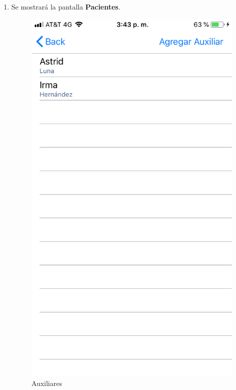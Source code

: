 \begin{enumerate}
	\item Se mostrará la pantalla \textbf{Pacientes}. 
	\newpage
	\begin{figure}[!htbp]			
		\hypertarget{fig:Auxiliares}{\hspace{1pt}}
		\begin{center}
			\includegraphics[height=0.4\textheight]{Paciente/AgregarAuxiliar/images/Auxiliares}
			\caption{Auxiliares}
			\label{fig:Auxiliares}
		\end{center}
	\end{figure}


\end{enumerate}
